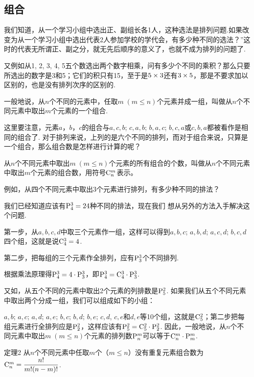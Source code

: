 \subsection{组合}
我们知道，从一个学习小组中选出正、副组长各1人，这种选法是排列问题.如果改变为从一个学习小组中选出代表2人参加学校的学代会，有多少种不同的选法？”这时的代表无所谓正、副之分，就无先后顺序的意义了，也就不成为排列的问题了.

又例如从1, 2, 3, 4, 5五个数选出两个数字相乘，问有多少个不同的乘积？那么只要所选出的数字是3和5；它们的积只有15，至于是$5\times3$还有$3\times5$，那是不要求加以区别的，也是没有排列次序的区别的.

一般地说，从$n$个不同的元素中，任取$m\; (m\le n)$个元素并成一组，叫做从$n$个不同元素中取出$m$个元素的一个组合.

这里要注意，元素$a$，$b$，$c$的组合与$a,c,b$; $c,a,b$; $b,a,c$; $b,c,a$或$c,b,a$都被看作是相同的组合了. 对于排列来说，上列的是六个不同的排列，而对于组合来说，只算是一个组合，那么组合数是怎样进行计算的呢？

从$n$个不同元素中取出$m\; (m\le n)$个元素的所有组合的个数，叫做从$n$个不同元素中取出$m$个元素的组合数，用符号${\rm C}^{m}_{n}$表示。

例如，从四个不同元素中取出3个元素进行排列，有多少种不同的排法？

我们已经知道应该有${\rm P}^{3}_{4}=24$种不同的排法，现在我们
想从另外的方法入手解决这个问题.

第一步，从$a,b,c,d$中取三个元素作一组，这样可以得到$a,b,c$; $a,b,d$; $a,c,d$; $b,c,d$四个组，这就是说${\rm C}^{3}_{4}=4$.

第二步，把每组的三个元素作全排列，应有${\rm P}^{3}_{3}$个不同排列.

根据乘法原理得${\rm P}^{3}_{4}=4\cdot {\rm P}^{3}_{3}$，即${\rm P}^{3}_{4}={\rm C}^{3}_{4}\cdot {\rm P}^{3}_{3}$.

又如，从五个不同的元素中取出2个元素的列排数是${\rm P}^{2}_{5}$. 如果我们从五个不同元素中取出两个分成一组，我们可以组成如下的小组：

$a,b$; $a,c$; $a,d$; $a,e$; $b,c$; $b,d$; $b,e$; $c,d$, $c,e$和$d,e$等10个组，这就是${\rm C}^{2}_{5}$；第二步把每组元素进行全排列应是${\rm P}^{2}_{2}$，这样应该有${\rm P}^{2}_{5}={\rm C}^{2}_{5}\cdot {\rm P}^{2}_{2}$. 因此，一般地说，从$n$个不同元素中取出$m\; (m\le n)$个元素的排列数${\rm P}^{m}_{n}$可以等于${\rm C}^{m}_{n}\cdot {\rm P}^{m}_{m}$.


\begin{blk}
  {定理2} 从$n$个不同元素中任取$m$个（$m\le n$）没有重复元素组合数为${\rm C}^{m}_{n}=\dfrac{n!}{m!(n-m)!}$.  
\end{blk}

